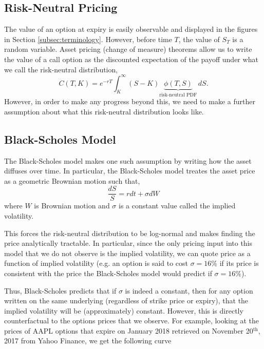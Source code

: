 \documentclass[twocolumn]{article}
\begin{document}
\subsection{Risk-Neutral Pricing}

The value of an option at expiry is easily observable and displayed in the
figures in Section \ref{subsec:terminology}. However, before time $T$, the
value of $S_T$ is a random variable. Asset pricing (change of measure) theorems
allow us to write the value of a call option as the discounted expectation of
the payoff under what we call the risk-neutral distribution,
\[ C(T,K) = e^{-rT} \int_K^\infty (S - K)
\underbrace{\phi(T,S)}_\text{risk-neutral PDF} \, dS.\]
However, in order to make any progress beyond this, we need to make a further
assumption about what this risk-neutral distribution looks like.

\subsection{Black-Scholes Model}
The Black-Scholes model makes one such assumption by writing how the asset
diffuses over time. In particular, the Black-Scholes model treates the asset
price as a geometric Brownian motion such that,
\[ \frac{dS}{S} = r dt + \sigma dW \]
where $W$ is Brownian motion and $\sigma$ is a constant value called the implied
volatility. 

This forces the risk-neutral distribution to be log-normal and makes
finding the price analytically tractable. In particular, since the only pricing
input into this model that we do not observe is the implied volatility, we can
quote price as a function of implied volatility (e.g. an option is said to cost
$\sigma=16\%$ if its price is consistent with the price the Black-Scholes model
would predict if $\sigma=16\%$).

Thus, Black-Scholes predicts that if $\sigma$ is indeed a constant, then for any
option written on the same underlying (regardless of strike price or expiry),
that the implied volatility will be (approximately) constant. However, this is
directly counterfactual to the options prices that we observe. For example,
looking at the prices of AAPL options that expire on January 2018 retrieved on
November 20$^\text{th}$, 2017 from Yahoo Finance, we get the following curve
\end{document}
